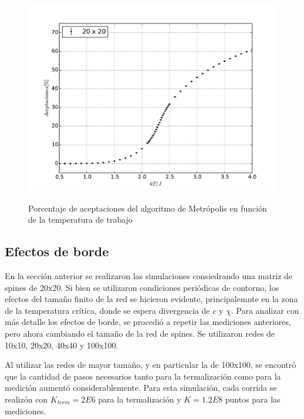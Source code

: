 \documentclass[a4paper,12pt]{article}
\begin{document}
\begin{figure}[H]
    \begin{center}
      \includegraphics[scale=0.5]{aceptaciones.pdf} \\
      \caption{Porcentaje de aceptaciones del algoritmo de Metrópolis en 
      función de la temperatura de trabajo}\label{fig:aceptaciones}
    \end{center}
\end{figure}

\subsection{Efectos de borde}

En la sección anterior se realizaron las simulaciones consiedrando una matriz 
de spines de 20x20. Si bien se utilizaron condiciones periódicas de contorno, 
los efectos del tamaño finito de la red se hicieron evidente, principalemnte en 
la zona de la temperatura crítica, donde se espera divergencia de $c$ y $\chi$. 
Para analizar con más detalle los efectos de borde, se procedió a repetir las 
mediciones anteriores, pero ahora cambiando el tamaño de la red de spines. Se 
utilizaron redes de 10x10, 20x20, 40x40 y 100x100.

Al utilizar las redes de mayor tamaño, y en particular la de 100x100, se 
encontró que la cantidad de pasos necesarios tanto para la termalización como 
para la medición aumentó considerablemente. Para esta simulación, cada corrida 
se realizón con $K_{term}=2E6$ para la termalización y $K=1.2E8$ puntos para 
las mediciones.
\end{document}
